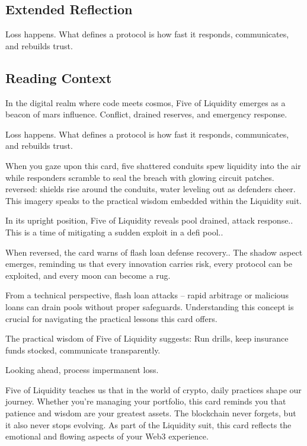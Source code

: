 \documentclass[11pt,oneside]{book}
\begin{document}
\begin{minipage}[t]{0.55\textwidth}
  \subsection*{Extended Reflection}
  Loss happens. What defines a protocol is how fast it responds, communicates, and rebuilds trust.

  \subsection*{Reading Context}
  In the digital realm where code meets cosmos, Five of Liquidity emerges as a beacon of mars influence. Conflict, drained reserves, and emergency response.

  Loss happens. What defines a protocol is how fast it responds, communicates, and rebuilds trust.

  When you gaze upon this card, five shattered conduits spew liquidity into the air while responders scramble to seal the breach with glowing circuit patches. reversed: shields rise around the conduits, water leveling out as defenders cheer. This imagery speaks to the practical wisdom embedded within the Liquidity suit.

  In its upright position, Five of Liquidity reveals pool drained, attack response.. This is a time of mitigating a sudden exploit in a defi pool..

  When reversed, the card warns of flash loan defense recovery.. The shadow aspect emerges, reminding us that every innovation carries risk, every protocol can be exploited, and every moon can become a rug.

  From a technical perspective, flash loan attacks – rapid arbitrage or malicious loans can drain pools without proper safeguards. Understanding this concept is crucial for navigating the practical lessons this card offers.

  The practical wisdom of Five of Liquidity suggests: Run drills, keep insurance funds stocked, communicate transparently.

  Looking ahead, process impermanent loss.

  Five of Liquidity teaches us that in the world of crypto, daily practices shape our journey. Whether you're managing your portfolio, this card reminds you that patience and wisdom are your greatest assets. The blockchain never forgets, but it also never stops evolving. As part of the Liquidity suit, this card reflects the emotional and flowing aspects of your Web3 experience.

\end{minipage}
\end{document}

